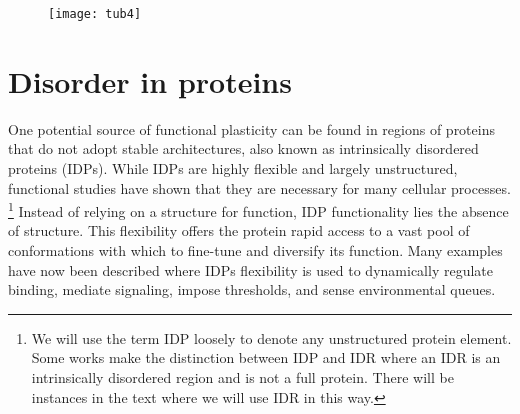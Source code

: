 \begin{figure}[h!]
\centering
\texttt{[image: tub4]}
\label{fig:tub4}
\end{figure}

\section{Disorder in proteins}

One potential source of functional plasticity can be found in regions of proteins that do not adopt stable architectures, also known as intrinsically disordered proteins (IDPs). While IDPs are highly flexible and largely unstructured, functional studies have shown that they are necessary for many cellular processes.  \footnote{We will use the term IDP loosely to denote any unstructured protein element. Some works make the distinction between IDP and IDR where an IDR is an intrinsically disordered region and is not a full protein. There will be instances in the text where we will use IDR in this way.} Instead of relying on a structure for function, IDP functionality lies the absence of structure. This flexibility offers the protein rapid access to a vast pool of conformations with which to fine-tune and diversify its function. Many examples have now been described where IDPs flexibility is used to dynamically regulate binding, mediate signaling, impose thresholds, and sense environmental queues. 


